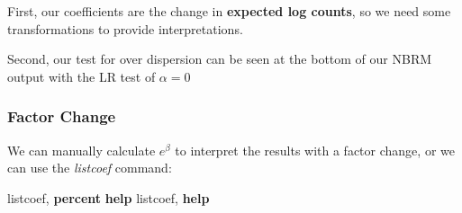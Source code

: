 \documentclass[
]{book}
\newenvironment{Shaded}{\begin{snugshade}}{\end{snugshade}}
\newcommand{\KeywordTok}[1]{\textcolor[rgb]{0.13,0.29,0.53}{\textbf{#1}}}
\newcommand{\NormalTok}[1]{#1}
\begin{document}
First, our coefficients are the change in \textbf{expected log counts}, so we need some transformations
to provide interpretations.

Second, our test for over dispersion can be seen at the bottom of our NBRM output with the LR test of \(\alpha = 0\)

\subsubsection*{Factor Change}\label{factor-change}

We can manually calculate \(e^{\beta}\) to interpret the results with a factor change, or we can use the \emph{listcoef} command:

\begin{Shaded}
\begin{Highlighting}[]
\NormalTok{listcoef, }\KeywordTok{percent} \KeywordTok{help}
\NormalTok{listcoef, }\KeywordTok{help}
\end{Highlighting}
\end{Shaded}
\end{document}
